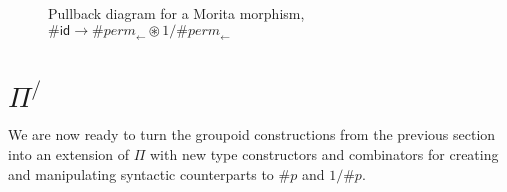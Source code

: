 \documentclass[a4paper,USenglish]{lipics-v2016-utf8x}
\newcommand{\hash}{\#}
\newcommand{\order}[1]{\hash #1}
\newcommand{\iorder}[1]{1/\hash #1}
\newcommand{\permfive}{\mathit{perm}_{\leftarrow}}
\newcommand{\idiso}{\mathsf{{id}}}
\begin{document}
\begin{figure}[h]
  \centering
  \caption{
    \label{fig:morita}
    Pullback diagram for a Morita morphism,
    $\order{\idiso} \rightarrow \order{\permfive} \circledast
    \iorder{\permfive}$
  }
\end{figure}

\section{$\Pi^/$}

We are now ready to turn the groupoid constructions from the previous section into an extension of $\Pi$ with new type constructors and combinators for creating and manipulating syntactic counterparts to $\order{p}$ and $\iorder{p}$.
\end{document}
